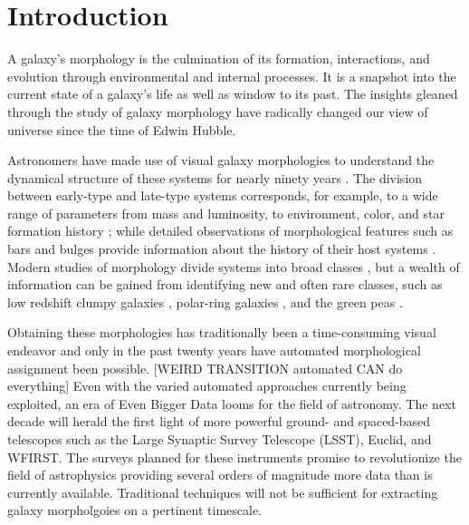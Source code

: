 
\chapter{Introduction}
\label{chap:intro}


A galaxy's morphology is the culmination of its formation, interactions, and evolution through environmental and internal processes. It is a snapshot into the current state of a galaxy's life as well as window to its past. The insights gleaned through the study of galaxy morphology have radically changed our view of universe since the time of Edwin Hubble. 


Astronomers have made use of visual galaxy morphologies to understand the dynamical structure of these systems for nearly ninety years 
\citep[e.g.,][]{Hubble1936, 
			deVauc1959, 
			Sandage1961, 
			vandenBergh1976, 
			NairAbraham2010, 
			Baillard2011}. 
The division between early-type and late-type systems corresponds, for example, to a wide range of parameters from mass and luminosity, to environment, color, and star formation history 
\citep[e.g.,][]{Kormendy1977,  
			Dressler1980, 
			Strateva2001, 
			Blanton2003a, 
			Kauffman2003, 
			Nakamura2003, 
			Shen2003, 
			Peng2010}; 
while detailed observations of morphological features such as bars and bulges provide information about the history of their host systems 
\citep[e.g.,][]{KK04, 
			Elmegreen2008, 
			Sheth2008, 
			Masters2010, 
			Simmons2014}. 
Modern studies of morphology  divide systems into broad classes 
\citep[e.g.,][]{Conselice2006, 
			Lintott2008, 
			Kartaltepe2015, 
			Peth2016}, 
but a wealth of information can be gained from identifying new and often rare classes, such as low redshift clumpy galaxies \citep[e.g.,][]{Elmegreen2013}, polar-ring galaxies \citep[e.g.,][]{Whitmore1990}, and the green peas \citep{Cardamone2009}. 

Obtaining these morphologies has traditionally been a time-consuming visual endeavor and only in the past twenty years have automated morphological assignment been possible. [WEIRD TRANSITION automated CAN do everything] Even with the varied automated approaches currently being exploited, an era of Even Bigger Data looms for the field of astronomy. The next decade will herald the first light of more powerful ground- and spaced-based telescopes such as the Large Synaptic Survey Telescope (LSST), Euclid, and WFIRST. The surveys planned for these instruments promise to revolutionize the field of astrophysics providing several orders of magnitude more data than is currently available. Traditional techniques will not be sufficient for extracting galaxy morpholgoies on a pertinent timescale. 


